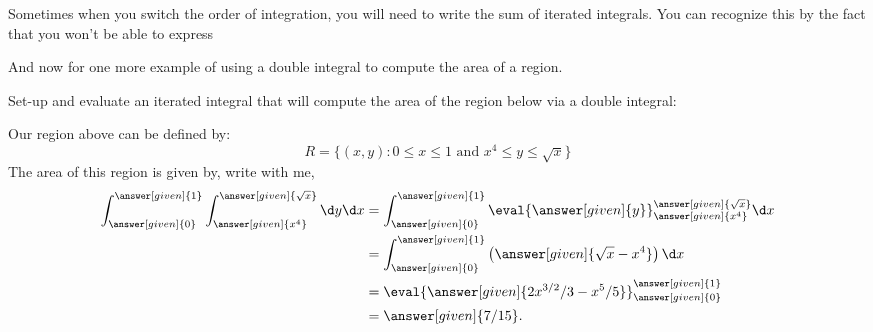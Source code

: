 \documentclass{ximera}
\begin{document}
Sometimes when you switch the order of integration, you will need to
write the sum of iterated integrals. You can recognize this by the
fact that you won't be able to express 






And now for one more example of using a double integral to compute the
area of a region.

\begin{example}
  Set-up and evaluate an iterated integral that will compute the area
  of the region below via a double integral:
  \begin{image}
  \end{image}
  \begin{explanation}
    Our region above can be defined by:
    \[
    R=\{(x,y):\text{$0\leq x\leq 1$ and $x^4\leq y\leq \sqrt{x}$}\}
    \]
    The area of this region is given by, write with me, 
    \begin{align*}
      \int_{\answer[given]{0}}^{\answer[given]{1}}\int_{\answer[given]{x^4}}^{\answer[given]{\sqrt{x}}}\d y \d x &= \int_{\answer[given]{0}}^{\answer[given]{1}} \eval{\answer[given]{y}}_{\answer[given]{x^4}}^{\answer[given]{\sqrt{x}}} \d x\\
      &=  \int_{\answer[given]{0}}^{\answer[given]{1}} \left(\answer[given]{\sqrt{x}-x^4}\right) \d x\\
      &=  \eval{\answer[given]{2x^{3/2}/3 - x^5/5}}_{\answer[given]{0}}^{\answer[given]{1}}\\
      &= \answer[given]{7/15}. 
    \end{align*}
  \end{explanation}
\end{example}
\end{document}
